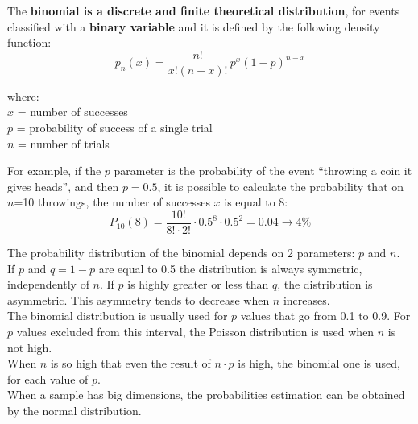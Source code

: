 
\begin{frame}
  \vspace*{.3cm}
  The \textbf{binomial is a discrete and finite theoretical distribution}, for events classified with a \textbf{binary variable} and it is defined by the following density function:\\
  \vspace*{.3cm}
  $$ p_n(x) = \frac{n!}{x!(n-x)!} \, p^x(1-p)^{n-x} $$
  \begin{tabbing}
    where: \hspace*{.25cm} \= \\
    \hspace*{.1cm} \> $ x $ = number of successes \\
    \hspace*{.1cm} \> $ p $ = probability of success of a single trial \\
    \hspace*{.1cm} \> $ n $ = number of trials
  \end{tabbing}
\end{frame}

\begin{frame}
  \vspace*{.5cm}
  For example, if the {\boldmath $ p $} parameter is the probability of the event ``throwing a coin it gives heads'', and then $ p = 0.5 $, it is possible to calculate the probability that on {\boldmath $ n $}=10 throwings, the number of successes {\boldmath $ x $} is equal to 8:\\
  \vspace*{.5cm}
  $$ P_{10}(8) = \frac{10!}{8!\cdot 2!}\cdot 0.5^8 \cdot 0.5^2 = 0.04 \rightarrow 4 \% $$  
\end{frame}

\begin{frame}
  The probability distribution of the binomial depends on 2 parameters: {\boldmath $ p $} and {\boldmath $ n $}.\\
  \vspace*{.2cm}
  If $ p $ and {\boldmath $ q = 1-p $} are equal to 0.5 the distribution is always symmetric, independently of $ n $. If $ p $ is highly greater or less than $ q $, the distribution is asymmetric. This asymmetry tends to decrease when $ n $ increases.\\
  \vspace*{.2cm}
  The binomial distribution is usually used for $ p $ values that go from 0.1 to 0.9. For $ p $ values excluded from this interval, the Poisson distribution is used when $ n $ is not high.\\
  \vspace*{.2cm}
  When $ n $ is so high that even the result of {\boldmath$n \cdot p$} is high, the binomial one is used, for each value of $ p $.\\
  \vspace*{.2cm}
  When a sample has big dimensions, the probabilities estimation can be obtained by the normal distribution.
\end{frame}

